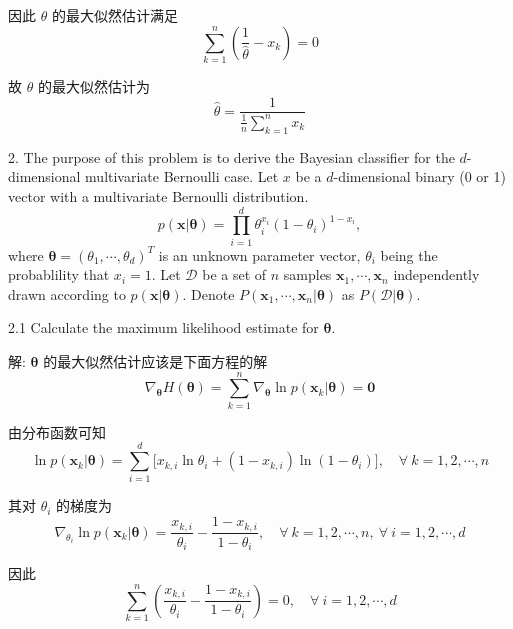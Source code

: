 \documentclass[openany]{ctexbook}
\theoremstyle{kaiti}
\theoremstyle{normal}
\begin{document}
因此 $\theta$ 的最大似然估计满足
\begin{equation}
  \sum_{k=1}^n\left(\frac{1}{\hat{\theta}}-x_k\right)=0
\end{equation}

故 $\theta$ 的最大似然估计为
\begin{equation}
  \hat{\theta}=\frac{1}{\displaystyle\frac{1}{n}\sum_{k=1}^nx_k}
\end{equation}

2. The purpose of this problem is to derive the Bayesian classifier for the $d$-dimensional multivariate Bernoulli case. Let $x$ be a $d$-dimensional binary (0 or 1) vector with a multivariate Bernoulli distribution.
\begin{equation}
  p(\bm{x}|\bm{\theta})
  =\prod_{i=1}^{d} \theta_{i}^{x_{i}}\left(1-\theta_{i}\right)^{1-x_{i}},
\end{equation}
where $\bm{\theta}=\left(\theta_{1}, \cdots, \theta_{d}\right)^{T}$ is an unknown parameter vector, $\theta_i$ being the probablility that $x_i=1$. Let $\mathcal{D}$ be a set of $n$ samples $\bm{x}_1, \cdots, \bm{x}_n$ independently drawn according to $p(\bm{x}|\bm{\theta})$. Denote $P\left(\bm{x}_{1}, \cdots, \bm{x}_{n}|\bm{\theta}\right)$ as $P(\mathcal{D}|\bm{\theta})$.

2.1 Calculate the maximum likelihood estimate for $\bm{\theta}$.

解: $\bm{\theta}$ 的最大似然估计应该是下面方程的解
\begin{equation}
  \nabla_{\bm{\theta}} H(\bm{\theta})=\sum_{k=1}^n\nabla_{\bm{\theta}}\ln p(\bm{x}_k|\bm{\theta})=\bm{0}
\end{equation}

由分布函数可知
\begin{equation}
  \ln p(\bm{x}_k|\bm{\theta})=\sum_{i=1}^d\big[x_{k,i}\ln\theta_i+(1-x_{k,i})\ln(1-\theta_i)\big],\quad\forall~k=1,2,\cdots,n
\end{equation}

其对 $\theta_i$ 的梯度为
\begin{equation}
  \nabla_{\theta_i}\ln p(\bm{x}_k|\bm{\theta})=\frac{x_{k,i}}{\theta_i}-\frac{1-x_{k,i}}{1-\theta_i},\quad\forall~k=1,2,\cdots,n,~\forall~i=1,2,\cdots,d
\end{equation}

因此
\begin{equation}
  \sum_{k=1}^n\left(\frac{x_{k,i}}{\theta_i}-\frac{1-x_{k,i}}{1-\theta_i}\right)=0,\quad\forall~i=1,2,\cdots,d
\end{equation}
\end{document}
